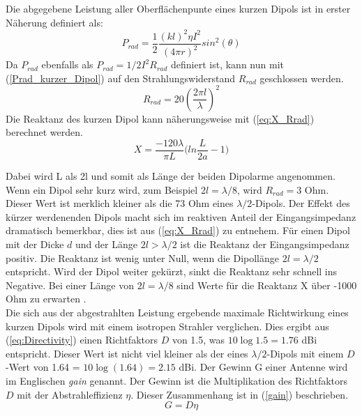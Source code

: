 Die abgegebene Leistung aller Oberflächenpunte eines kurzen Dipols ist in erster Näherung definiert als:
\begin{equation}
P_{rad}=\dfrac{1}{2}\dfrac{(kl)^{2}\eta I^{2}}{(4\pi r)^{2}}sin^{2}(\theta)
\label{Prad_kurzer_Dipol}
\end{equation}
Da $P_{rad}$ ebenfalls als $P_{rad}=1/2I^{2}R_{rad}$ definiert ist, kann nun mit (\ref{Prad_kurzer_Dipol}) auf den  Strahlungswiderstand $R_{rad}$ geschlossen werden.
\begin{equation}
R_{rad}=20 (\dfrac{2 \pi l}{\lambda})^{2}
\label{R_rad_kurzer_Dipol}
\end{equation}
Die Reaktanz des kurzen Dipol kann näherungsweise mit (\ref{eq:X_Rrad}) berechnet werden.
\begin{equation}\label{eq:X_Rrad}
X=\dfrac{-120\lambda}{\pi L}\biggl(ln\dfrac{L}{2a}-1\biggr)
\end{equation}

Dabei wird L als 2l und somit als Länge der beiden Dipolarme angenommen.
Wenn ein Dipol sehr kurz wird, zum Beispiel $2l=\lambda/8$,  wird $R_{rad} = 3$ Ohm. Dieser Wert ist merklich kleiner als die 73 Ohm eines $\lambda/2$-Dipols. Der Effekt des kürzer werdenenden Dipols macht sich im  reaktiven Anteil der Eingangsimpedanz dramatisch bemerkbar, dies ist aus (\ref{eq:X_Rrad}) zu entnehem. Für einen Dipol mit der Dicke $d$ und der Länge $2l>\lambda/2$ ist die Reaktanz der Eingangsimpedanz positiv. Die Reaktanz ist wenig unter Null, wenn die Dipollänge $2l=\lambda/2$ entspricht. Wird der Dipol weiter gekürzt,  sinkt die Reaktanz sehr schnell ins Negative. Bei einer Länge von $2l=\lambda/8$ sind Werte für die Reaktanz X über -1000 Ohm zu erwarten \cite{elliott1981antenna}. \\
Die sich aus der abgestrahlten Leistung ergebende maximale Richtwirkung eines kurzen Dipols wird mit einem isotropen Strahler verglichen. Dies ergibt aus (\ref{eq:Directivity}) einen Richtfaktors $D$ von 1.5, was $10\log{1.5}=1.76$ dBi entspricht. Dieser Wert ist nicht viel kleiner als der eines $\lambda/2$-Dipols mit einem $D$-Wert von 1.64 = $10\log{(1.64)}=2.15$ dBi. Der Gewinn G einer Antenne wird im Englischen \textit{gain} genannt. Der Gewinn ist die Multiplikation des Richtfaktors $D$ mit der Abstrahleffizienz $\eta$. Dieser Zusammenhang ist in (\ref{gain}) beschrieben.
\begin{equation}\label{gain}
G=D\eta
\end{equation}




